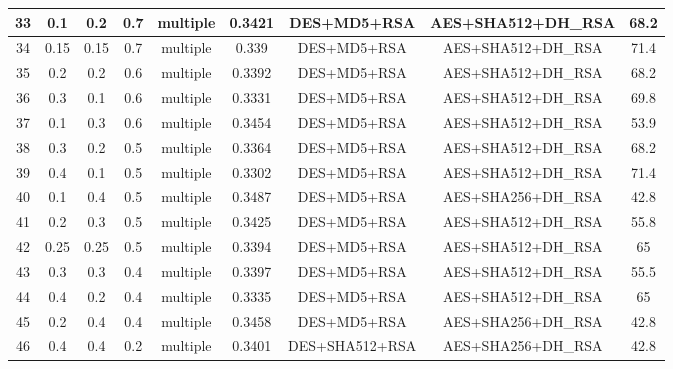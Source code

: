 \documentclass[3p,times]{elsarticle}
\begin{document}
\begin{table*}[!hp]
{\begin{tabular}{|c|c|c|c|c|c|c|c|c| }
33&0.1&             0.2&	          0.7&	multiple&	          0.3421&    DES+MD5+RSA&AES+SHA512+DH\_RSA&68.2\\\hline
34&0.15&            0.15&         0.7&	multiple&	          0.339&    DES+MD5+RSA&AES+SHA512+DH\_RSA&71.4\\\hline
35&0.2&             0.2&	          0.6&	multiple&	          0.3392&    DES+MD5+RSA&AES+SHA512+DH\_RSA&68.2\\\hline
36&0.3&             0.1&	          0.6&	multiple&	          0.3331&   DES+MD5+RSA&AES+SHA512+DH\_RSA&69.8\\\hline
37&0.1&             0.3&	          0.6&	multiple&	          0.3454&    DES+MD5+RSA&AES+SHA512+DH\_RSA&53.9\\\hline
38&0.3&             0.2&	          0.5&	multiple&	          0.3364&    DES+MD5+RSA&AES+SHA512+DH\_RSA&68.2\\\hline
39&0.4&             0.1&	          0.5&	multiple&	          0.3302&    DES+MD5+RSA&AES+SHA512+DH\_RSA&71.4\\\hline
40&0.1&             0.4&	          0.5&	multiple&	          0.3487&   DES+MD5+RSA&AES+SHA256+DH\_RSA&42.8\\\hline
41&0.2&             0.3&	          0.5&	multiple&	          0.3425&    DES+MD5+RSA&AES+SHA512+DH\_RSA&55.8\\\hline
42&0.25&           0.25&         0.5&	multiple&	          0.3394&    DES+MD5+RSA&AES+SHA512+DH\_RSA&65\\\hline
43&0.3&             0.3&	          0.4&	multiple&	          0.3397&    DES+MD5+RSA&AES+SHA512+DH\_RSA&55.5\\\hline
44&0.4&             0.2&	          0.4&	multiple&	          0.3335&   DES+MD5+RSA&AES+SHA512+DH\_RSA&65\\\hline
45&0.2&             0.4&	          0.4&	multiple&	          0.3458&    DES+MD5+RSA&AES+SHA256+DH\_RSA&42.8\\\hline
46&0.4&             0.4&	          0.2&	multiple&	          0.3401&    DES+SHA512+RSA&AES+SHA256+DH\_RSA&42.8\\

\hline
    \end{tabular}
}
\label{table:weight_table} \end{table*}
\end{document}

